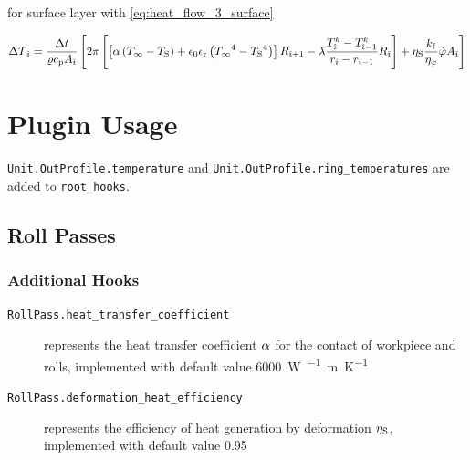 \documentclass{scrartcl}
\begin{document}
    for surface layer with \autoref{eq:heat_flow_3_surface}

    \begin{equation}
        {\Delta T}_{\hat{\imath}} = \frac{{\Delta t}}{{\varrho}{c_\mathrm{p}}{A}_{\hat{\imath}}}
        \left[
        2 \pi \left[
            \left[ {\alpha} \left( {T_\infty} - {T_\mathrm{S}} \right) + {\epsilon_0}{\epsilon_\mathrm{r}}\left( {T_\infty}^4 - {T_\mathrm{S}}^4 \right) \right]
            {R}_{{\hat{\imath}}+1}
            -{\lambda} \frac{{T}_{{\hat{\imath}}}^{k} - {T}_{{\hat{\imath}}-1}^{k}}{{r}_{{\hat{\imath}}}-{r}_{{\hat{\imath}}-1}}
            {R}_{{\hat{\imath}}}
            \right]
        + {\eta_\mathrm{S}} \frac{{k_\mathrm{f}}}{{\eta_\varphi}} {\dot{\varphi}} {A}_{{\hat{\imath}}}
        \right]
        \label{eq:increment_surface}
    \end{equation}


    \section{Plugin Usage}\label{sec:plugin-usage}

    \texttt{Unit.OutProfile.temperature} and \texttt{Unit.OutProfile.ring\_temperatures} are added to \texttt{root\_hooks}.

    \subsection{Roll Passes}

    \subsubsection{Additional Hooks}

    \begin{description}
        \item[\texttt{RollPass.heat\_transfer\_coefficient}] represents the heat transfer coefficient ${\alpha}$ for the contact of workpiece and rolls, implemented with default value \qty{6000}{\watt\per\squared\meter\per\kelvin}
        \item[\texttt{RollPass.deformation\_heat\_efficiency}] represents the efficiency of heat generation by deformation ${\eta_\mathrm{S}}$, implemented with default value \num{0.95}
    \end{description}
\end{document}
